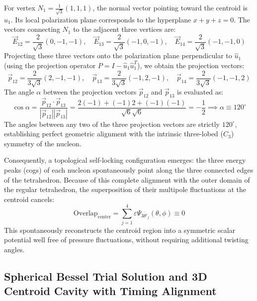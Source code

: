 \documentclass[12pt, a4paper]{article}
\begin{document}
For vertex $N_1 = \frac{1}{\sqrt{3}}(1,1,1)$, the normal vector pointing toward the centroid is $\hat{u}_1$. Its local polarization plane corresponds to the hyperplane $x+y+z=0$. The vectors connecting $N_1$ to the adjacent three vertices are:
\begin{equation}
\vec{E}_{12} = \frac{2}{\sqrt{3}}(0, -1, -1), \quad \vec{E}_{13} = \frac{2}{\sqrt{3}}(-1, 0, -1), \quad \vec{E}_{14} = \frac{2}{\sqrt{3}}(-1, -1, 0)
\end{equation}
Projecting these three vectors onto the polarization plane perpendicular to $\hat{u}_1$ (using the projection operator $P = I - \hat{u}_1\hat{u}_1^T$), we obtain the projection vectors:
\begin{equation}
\vec{p}_{12} = \frac{2}{3\sqrt{3}}(2, -1, -1), \quad \vec{p}_{13} = \frac{2}{3\sqrt{3}}(-1, 2, -1), \quad \vec{p}_{14} = \frac{2}{3\sqrt{3}}(-1, -1, 2)
\end{equation}
The angle $\alpha$ between the projection vectors $\vec{p}_{12}$ and $\vec{p}_{13}$ is evaluated as:
\begin{equation}
\cos\alpha = \frac{\vec{p}_{12} \cdot \vec{p}_{13}}{|\vec{p}_{12}||\vec{p}_{13}|} = \frac{2(-1) + (-1)2 + (-1)(-1)}{\sqrt{6}\sqrt{6}} = -\frac{1}{2} \implies \alpha \equiv 120^\circ
\end{equation}
The angles between any two of the three projection vectors are strictly $120^\circ$, establishing perfect geometric alignment with the intrinsic three-lobed ($C_3$) symmetry of the nucleon.

Consequently, a topological self-locking configuration emerges: the three energy peaks (cogs) of each nucleon spontaneously point along the three connected edges of the tetrahedron. Because of this complete alignment with the outer domain of the regular tetrahedron, the superposition of their multipole fluctuations at the centroid cancels:
\begin{equation}
\mathrm{Overlap}_{\mathrm{center}} = \sum_{j=1}^4 \varepsilon \Psi_{3\theta'_j}(\theta, \phi) \equiv 0
\end{equation}
This spontaneously reconstructs the centroid region into a symmetric scalar potential well free of pressure fluctuations, without requiring additional twisting angles.





\subsection{Spherical Bessel Trial Solution and 3D Centroid Cavity with Timing Alignment}
\end{document}

